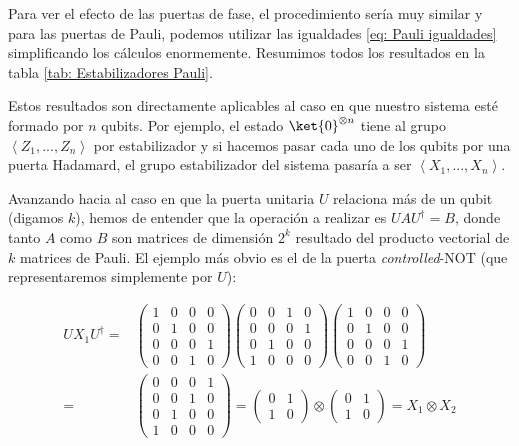 \documentclass[11pt,a4paper,twoside,pdf]{article}
\numberwithin{equation}{section}
\begin{document}
		Para ver el efecto de las puertas de fase, el procedimiento sería muy similar y para las puertas de Pauli, podemos utilizar las igualdades \ref{eq: Pauli igualdades} simplificando los cálculos enormemente. Resumimos todos los resultados en la tabla \ref{tab: Estabilizadores Pauli}.
		
		Estos resultados son directamente aplicables al caso en que nuestro sistema esté formado por $n$ qubits. Por ejemplo, el estado $\ket{0}^{\otimes n}$ tiene al grupo $\left\langle Z_1,...,Z_n\right\rangle $ por estabilizador y si hacemos pasar cada uno de los qubits por una puerta Hadamard, el grupo estabilizador del sistema pasaría a ser $\left\langle X_1,...,X_n\right\rangle$.
		
		Avanzando hacia al caso en que la puerta unitaria $U$ relaciona más de un qubit (digamos $k$), hemos de entender que la operación a realizar es $UAU^{\dagger}=B$, donde tanto $A$ como $B$ son matrices de dimensión $2^k$ resultado del producto vectorial de $k$ matrices de Pauli. El ejemplo más obvio es el de la puerta \textit{controlled}-NOT (que representaremos simplemente por $U$):
		
			\begin{equation}\label{eq: CNOT estabilizador}
				\begin{aligned}
				UX_1U^{\dagger} =& 
					\left(\begin{array}{cccc}
						1 & 0 & 0 & 0\\
						0 & 1 & 0 & 0\\
						0 & 0 & 0 & 1\\
						0 & 0 & 1 & 0
					\end{array}\right)	
					\left(\begin{array}{cccc}
						0 & 0 & 1 & 0\\
						0 & 0 & 0 & 1\\
						0 & 1 & 0 & 0\\
						1 & 0 & 0 & 0
					\end{array}\right)	
					\left(\begin{array}{cccc}
						1 & 0 & 0 & 0\\
						0 & 1 & 0 & 0\\
						0 & 0 & 0 & 1\\
						0 & 0 & 1 & 0
					\end{array}\right)	\\ =& 
					\left(\begin{array}{cccc}
						0 & 0 & 0 & 1\\
						0 & 0 & 1 & 0\\
						0 & 1 & 0 & 0\\
						1 & 0 & 0 & 0
					\end{array}\right)	=
					\left(\begin{array}{cc}
						0 & 1 \\
						1 & 0 
					\end{array} \right)	\otimes
					\left(\begin{array}{cc}
						0 & 1 \\
						1 & 0 
					\end{array} \right)	= X_1 \otimes X_2
				\end{aligned}	
			\end{equation}
		
\end{document}
